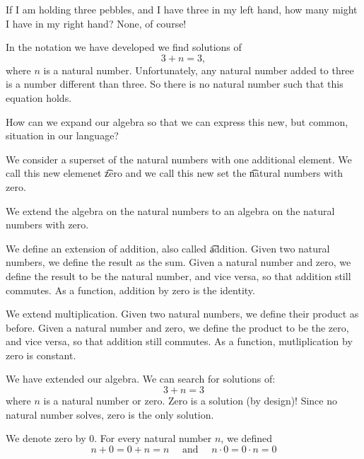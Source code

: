 
\sbasic














\sstart
{}


If I am holding
three pebbles, and I have three
in my left hand, how many
might I have in my right hand?
None, of course!

In the notation we have developed
we find solutions of
\[
  3 + n = 3,
\]
where $n$ is a natural number.
Unfortunately, any natural number
added to three is a number different
than three.
So there is no natural number
such that this equation holds.

How can we expand our algebra
so that we can express this
new, but common, situation in
our language?


We consider a superset
of the natural numbers with
one additional element.
We call this new elemenet
\t{zero}
and we call this new set
the
\t{natural numbers with zero}.


We extend the algebra on
the natural numbers to an
algebra on the natural numbers
with zero.

We define an extension of addition,
also called
\t{addition}.
Given two natural
numbers, we define the
result as the sum.
Given a natural number
and zero,
we define the result
to be the natural number,
and vice versa,
so that addition
still commutes.
As a function, addition
by zero is the identity.

We extend multiplication.
Given two natural
numbers, we define their
product as before.
Given a natural number
and zero,
we define the product
to be the zero,
and vice versa,
so that addition
still commutes.
As a function, mutliplication
by zero is constant.


We have extended our algebra.
We can search for solutions of:
\[
  3 + n = 3
\]
where $n$ is a natural
number or zero.
Zero is a solution (by design)!
Since no natural number
solves, zero is
the only solution.


We denote zero by $0$.
For every natural number
$n$, we defined
\[
  n + 0 = 0 + n = n \quad \text{ and } \quad n \cdot 0 = 0 \cdot n = 0
\]
\strats
